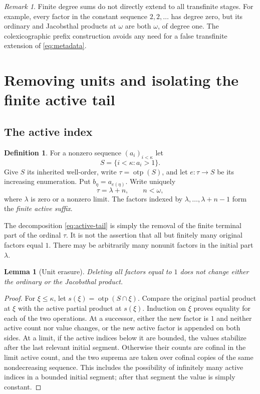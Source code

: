 \documentclass[11pt,letterpaper]{article}
\newtheorem{lemma}[theorem]{Lemma}
\theoremstyle{definition}
\newtheorem{definition}[theorem]{Definition}
\theoremstyle{remark}
\newtheorem{remark}[theorem]{Remark}
\newcommand{\otp}{\operatorname{otp}}
\begin{document}
\begin{remark}
Finite degree sums do not directly extend to all transfinite stages.
For example, every factor in the constant sequence $2,2,\ldots$ has degree
zero, but its ordinary and Jacobsthal products at $\omega$ are both
$\omega$, of degree one. The colexicographic prefix construction avoids
any need for a false transfinite extension of \eqref{eq:metadata}.
\end{remark}

\section{Removing units and isolating the finite active tail}\label{sec:active}

\subsection{The active index}

\begin{definition}
For a nonzero sequence $(a_i)_{i<\kappa}$ let
\[
 S=\{i<\kappa:a_i>1\}.
\]
Give $S$ its inherited well-order, write $\tau=\otp(S)$, and let
$e:\tau\to S$ be its increasing enumeration. Put $b_\eta=a_{e(\eta)}$.
Write uniquely
\begin{equation}\label{eq:active-tail}
 \tau=\lambda+n,\qquad n<\omega,
\end{equation}
where $\lambda$ is zero or a nonzero limit. The factors indexed by
$\lambda,\ldots,\lambda+n-1$ form the \emph{finite active suffix}.
\end{definition}

The decomposition \eqref{eq:active-tail} is simply the removal of the
finite terminal part of the ordinal $\tau$. It is not the assertion
that all but finitely many original factors equal $1$. There may be
arbitrarily many nonunit factors in the initial part $\lambda$.

\begin{lemma}[Unit erasure]\label{lem:unit-erasure}
Deleting all factors equal to $1$ does not change either the ordinary
or the Jacobsthal product.
\end{lemma}

\begin{proof}
For $\xi\leq\kappa$, let $s(\xi)=\otp(S\cap\xi)$. Compare the original
partial product at $\xi$ with the active partial product at $s(\xi)$.
Induction on $\xi$ proves equality for each of the two operations.
At a successor, either the new factor is $1$ and neither active count
nor value changes, or the new active factor is appended on both sides.
At a limit, if the active indices below it are bounded, the values
stabilize after the last relevant initial segment. Otherwise their
counts are cofinal in the limit active count, and the two suprema are
taken over cofinal copies of the same nondecreasing sequence. This
includes the possibility of infinitely many active indices in a bounded
initial segment; after that segment the value is simply constant.
\end{proof}
\end{document}
